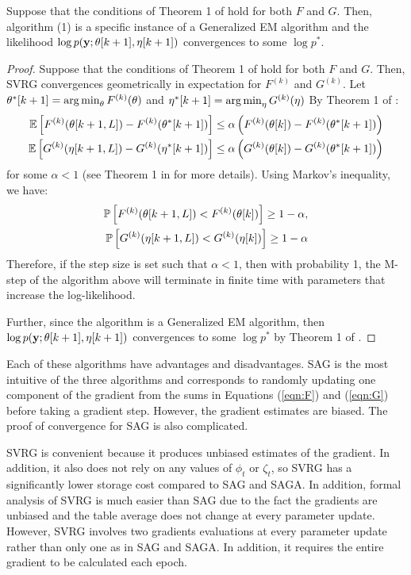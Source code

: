 \begin{lemma}
    Suppose that the conditions of Theorem 1 of \citet{Johnson:2013} hold for both $F$ and $G$. Then, algorithm (1) is a specific instance of a Generalized EM algorithm and the likelihood $\log p(\mathbf{y} ; \theta[k+1],\eta[k+1])$ convergences to some $\log p^*$.
\end{lemma}
%
\begin{proof}
Suppose that the conditions of Theorem 1 of \citet{Johnson:2013} hold for both $F$ and $G$. Then, SVRG convergences geometrically in expectation for $F^{(k)}$ and $G^{(k)}$. Let $\theta^*[k+1] = \operatorname*{arg\,min}_\theta F^{(k)}(\theta)$ and $\eta^*[k+1] = \operatorname*{arg\,min}_\eta G^{(k)}(\eta)$ By Theorem 1 of \citet{Johnson:2013}: 
%
\begin{align*}
    \mathbb{E}\left[F^{(k)}(\theta[k+1,L]) - F^{(k)}(\theta^*[k+1])\right] \leq \alpha \left(F^{(k)}(\theta[k]) - F^{(k)}(\theta^*[k+1])\right) \\
    \mathbb{E}\left[G^{(k)}(\eta[k+1,L]) - G^{(k)}(\eta^*[k+1])\right] \leq \alpha \left(G^{(k)}(\theta[k]) - G^{(k)}(\theta^*[k+1])\right)
\end{align*}
%
for some $\alpha < 1$ (see Theorem 1 in \citet{Johnson:2013} for more details). Using Markov's inequality, we have:
\begin{align*}
    \mathbb{P}\left[F^{(k)}(\theta[k+1,L]) < F^{(k)}(\theta[k])\right] \geq 1-\alpha, \\
    \mathbb{P}\left[G^{(k)}(\eta[k+1,L]) < G^{(k)}(\eta[k])\right] \geq 1-\alpha
\end{align*}
Therefore, if the step size is set such that $\alpha < 1$, then with probability 1, the M-step of the algorithm above will terminate in finite time with parameters that increase the log-likelihood.

Further, since the algorithm is a Generalized EM algorithm, then $\log p(\mathbf{y} ; \theta[k+1],\eta[k+1])$ convergences to some $\log p^*$ by Theorem 1 of \citep{Wu:1983}.
\end{proof}

Each of these algorithms have advantages and disadvantages. SAG is the most intuitive of the three algorithms and corresponds to randomly updating one component of the gradient from the sums in Equations (\ref{eqn:F}) and (\ref{eqn:G}) before taking a gradient step. However, the gradient estimates are biased. The proof of convergence for SAG is also complicated.

SVRG is convenient because it produces unbiased estimates of the gradient. In addition, it also does not rely on any values of $\phi_t$ or $\zeta_t$, so SVRG has a significantly lower storage cost compared to SAG and SAGA. In addition, formal analysis of SVRG is much easier than SAG due to the fact the gradients are unbiased and the table average does not change at every parameter update. However, SVRG involves two gradients evaluations at every parameter update rather than only one as in SAG and SAGA. In addition, it requires the entire gradient to be calculated each epoch.

